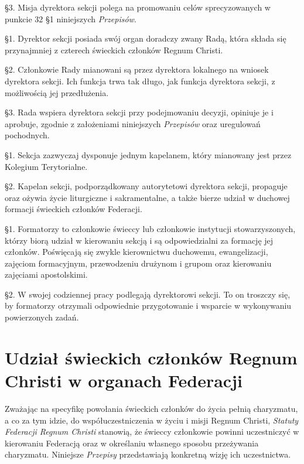 \S{}3. Misja dyrektora sekcji polega na promowaniu celów sprecyzowanych w punkcie 32 \S{}1 niniejszych {\em Przepisów}.


 \S{}1. Dyrektor sekcji posiada swój organ doradczy zwany Radą, która składa się przynajmniej z czterech świeckich członków Regnum Christi.

\S{}2. Członkowie Rady mianowani są przez dyrektora lokalnego na wniosek dyrektora sekcji. Ich funkcja trwa tak długo, jak funkcja dyrektora sekcji, z możliwością jej przedłużenia.

\S{}3. Rada wspiera dyrektora sekcji przy podejmowaniu decyzji, opiniuje je i aprobuje, zgodnie z założeniami niniejszych {\em Przepisów} oraz uregulowań pochodnych.


 \S{}1. Sekcja zazwyczaj dysponuje jednym kapelanem, który mianowany jest przez Kolegium Terytorialne.

\S{}2. Kapelan sekcji, podporządkowany autorytetowi dyrektora sekcji, propaguje oraz ożywia życie liturgiczne i sakramentalne, a także bierze udział w duchowej formacji świeckich członków Federacji.


 \S{}1. Formatorzy to członkowie świeccy lub członkowie instytucji stowarzyszonych, którzy biorą udział w kierowaniu sekcją i są odpowiedzialni za formację jej członków. Poświęcają się zwykle kierownictwu duchowemu, ewangelizacji, zajęciom formacyjnym, przewodzeniu drużynom i grupom oraz kierowaniu zajęciami apostolskimi.

\S{}2. W swojej codziennej pracy podlegają dyrektorowi sekcji. To on troszczy się, by formatorzy otrzymali odpowiednie przygotowanie i wsparcie w wykonywaniu powierzonych zadań.

\chapter{Udział świeckich członków Regnum Christi w organach Federacji}


 Zważając na specyfikę powołania świeckich członków do życia pełnią charyzmatu, a co za tym idzie, do współuczestniczenia w życiu i misji Regnum Christi, {\em Statuty Federacji Regnum Christi} stanowią, że świeccy członkowie powinni uczestniczyć w kierowaniu Federacją oraz w określaniu własnego sposobu przeżywania charyzmatu. Niniejsze {\em Przepisy} przedstawiają konkretną wizję ich uczestnictwa.


